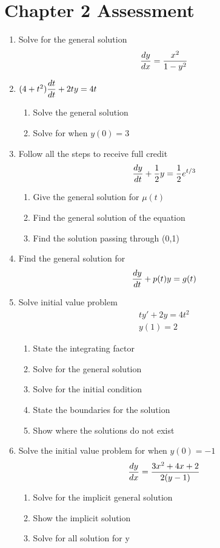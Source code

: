 \section{Chapter 2 Assessment}
\begin{multicols*}{2}
	\begin{enumerate}
		\item Solve for the general solution 
		$$\dfrac{d y}{d x} = \dfrac{x^2}{1-y^2}$$
		\item $ (4+t^2) \dfrac{d t}{d t} + 2ty = 4t$
		\begin{enumerate}
			\item Solve the general solution
			\item Solve for when $y(0) = 3$ 
		\end{enumerate}
		\item Follow all the steps to receive full credit $$\dfrac{d y}{d t} + \dfrac{1}{2} y = \dfrac{1}{2}e^{t/3}$$ 
		\begin{enumerate}
			\item Give the general solution for $\mu(t)$
			\item Find the general solution of the equation
			\item Find the solution passing through (0,1)
		\end{enumerate}
		\item Find the general solution for 
		$$\dfrac{d y}{d t} + p(t)y	 = g(t)$$
		\item Solve initial value problem 
		\begin{align*}
		ty' + 2y = 4t^2 \\
		y(1) = 2
		\end{align*}
		\begin{enumerate}
			\item State the integrating factor
			\item Solve for the general solution
			\item Solve for the initial condition
			\item State the boundaries for the solution
			\item Show where the solutions do not exist 
		\end{enumerate}
		\item Solve the initial value problem for when $y(0) = -1$
		$$\dfrac{d y}{d x} = \dfrac{3x^2+4x+2}{2(y-1)}$$
		\begin{enumerate}
			\item Solve for the implicit general solution
			\item Show the implicit solution
			\item Solve for all solution for y

\end{enumerate}
\end{enumerate}
\end{multicols*}
